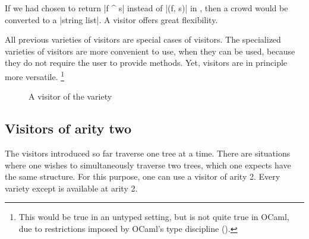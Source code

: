 \documentclass[11pt,a4paper,twoside]{article}
\begin{document}
If we had chosen to return \oc|f ^ s| instead of \oc|(f, s)| in
, then a crowd would be converted to
a \oc|string list|. A \fold visitor offers great flexibility.

All previous varieties of visitors are special cases of \fold visitors. The
specialized varieties of visitors are more convenient to use, when they can be
used, because they do not require the user to provide \tyconascendingmethod{}
methods. Yet, \fold visitors are in principle more versatile.%
%
\footnote{This would be true in an untyped setting, but is not quite true in OCaml,
due to restrictions imposed by OCaml's type discipline ().}




\begin{figure}[p]
\vspace{-\baselineskip}
\caption{A visitor of the \itertwo variety}
\label{fig:expr02}
\end{figure}

\begin{comment}
\begin{figure}[p]
\orig{expr03}
\vspace{-\baselineskip}
\processed{expr03}
\caption{A visitor of the \maptwo variety}
\label{fig:expr03}
\end{figure}
\end{comment}

\subsection{Visitors of arity two}
\label{sec:intro:aritytwo}

The visitors introduced so far traverse one tree at a time. There are
situations where one wishes to simultaneously traverse two trees, which one
expects have the same structure. For this purpose, one can use a visitor of
arity 2. Every variety except \mapendo is available at arity 2.
\end{document}
